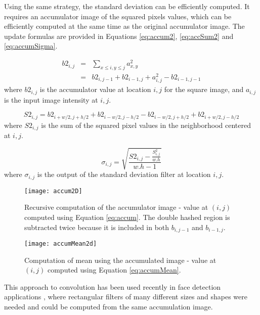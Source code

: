 \documentclass{InsightArticle}
\begin{document}
Using the same strategy, the standard deviation can be efficiently
computed.  It requires an accumulator image of the squared pixels
values, which can be efficiently computed at the same time as the
original accumulator image. The update formulas are provided in
Equations \ref{eq:accum2}, \ref{eq:accSum2} and \ref{eq:accumSigma}.

\begin{eqnarray}
\label{eq:accum2}
b2_{i,j} & = & \sum_{x \leq i, y \leq j} a_{x,y}^2 \\ \nonumber
	& = & b2_{i,j-1} + b2_{i-1, j} + a_{i,j}^2 - b2_{i-1, j-1}
\end{eqnarray}
where $b2_{i,j}$ is the accumulator value at location $i,j$ for the square image, and $a_{i,j}$ is the input image intensity at $i,j$.

\begin{equation}
\label{eq:accSum2}
S2_{i,j} = b2_{i+w/2,j+h/2} + b2_{i-w/2,j-h/2} - b2_{i-w/2,j+h/2} + b2_{i+w/2,j-h/2}
\end{equation}
where $S2_{i,j}$ is the sum of the squared pixel values in the neighborhood centered at $i,j$.

\begin{equation}
\label{eq:accumSigma}
\sigma_{i,j} = \sqrt{\frac{S2_{i,j} - \frac{S_{i,j}^2}{w.h}}{w.h-1}}
\end{equation}
where $\sigma_{i,j}$ is the output of the standard deviation filter at location $i,j$.

\begin{figure}[htbp]
\centering
\texttt{[image: accum2D]}
\caption{Recursive computation of the accumulator image - value at $(i,j)$ computed using Equation \ref{eq:accum}. The double hashed region is subtracted twice because it is included in both $b_{i,j-1}$ and $b_{i-1, j}$.\label{fig:accum}}
\end{figure}

\begin{figure}[htbp]
\centering
\texttt{[image: accumMean2d]}
\caption{Computation of mean using the accumulated image - value at $(i,j)$ computed using Equation \ref{eq:accumMean}.\label{fig:accumMean}}
\end{figure}

This approach to convolution has been used recently in face detection
applications \cite{Viola2004}, where rectangular filters of many
different sizes and shapes were needed and could be computed from the same accumulation image.
\end{document}
